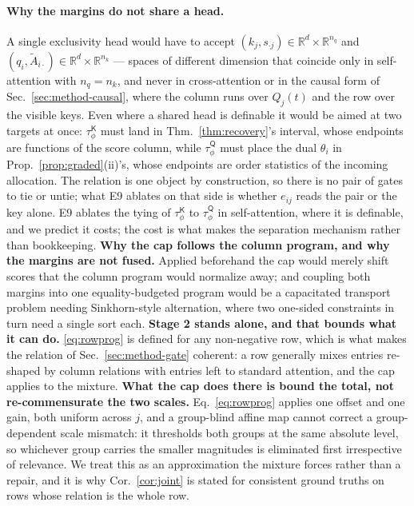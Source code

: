 \documentclass{article}
\newcommand{\tauK}{\tau^{\mathsf{K}}_\phi}
\newcommand{\tauQ}{\tau^{\mathsf{Q}}_\phi}
\begin{document}
\paragraph{Why the margins do not share a head.} A single exclusivity head would have to accept
$(k_j,s_{\cdot j}) \in \mathbb{R}^d\times\mathbb{R}^{n_q}$ and $(q_i,\tilde A_{i\cdot}) \in
\mathbb{R}^d\times\mathbb{R}^{n_k}$ --- spaces of different dimension that coincide only in
self-attention with $n_q=n_k$, and never in cross-attention or in the causal form of
Sec.~\ref{sec:method-causal}, where the column runs over $Q_j(t)$ and the row over the visible
keys. Even where a shared head is definable it would be aimed at two targets at once:
$\tauK$ must land in Thm.~\ref{thm:recovery}'s interval, whose endpoints are functions of the
score column, while $\tauQ$ must place the dual $\theta_i$ in Prop.~\ref{prop:graded}(ii)'s,
whose endpoints are order statistics of the incoming allocation. The relation is one object by
construction, so there is no pair of gates to tie or untie; what E9 ablates on that side is
whether $e_{ij}$ reads the pair or the key alone. E9 ablates the tying of $\tauK$ to $\tauQ$
in self-attention, where it is definable, and we predict it costs; the cost is what makes the
separation mechanism rather than bookkeeping.
\textbf{Why the cap follows the column program, and why the margins are not fused.} Applied
beforehand the cap would merely shift scores that the column program would normalize away; and
coupling both margins into one equality-budgeted program would be a capacitated transport
problem needing Sinkhorn-style alternation, where two one-sided constraints in turn need a single
sort each.
\textbf{Stage 2 stands alone, and that bounds what it can do.} \eqref{eq:rowprog} is defined for
any non-negative row, which is what makes the relation of Sec.~\ref{sec:method-gate} coherent: a row
generally mixes entries re-shaped by column relations with entries left to standard attention, and
the cap applies to the mixture. \textbf{What the cap does there is bound the total, not
re-commensurate the two scales.} Eq.~\eqref{eq:rowprog} applies one offset and one gain, both
uniform across $j$, and a group-blind affine map cannot correct a group-dependent scale
mismatch: it thresholds both groups at the same absolute level, so whichever group carries the
smaller magnitudes is eliminated first irrespective of relevance. We treat this as an
approximation the mixture forces rather than a repair, and it is why Cor.~\ref{cor:joint} is
stated for consistent ground truths on rows whose relation is the whole row.
\end{document}
